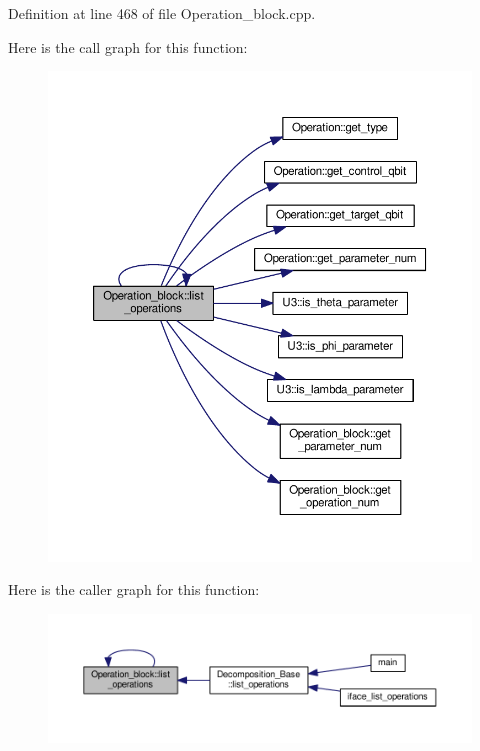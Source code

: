 Definition at line 468 of file Operation\+\_\+block.\+cpp.



Here is the call graph for this function\+:
\nopagebreak
\begin{figure}[H]
\begin{center}
\leavevmode
\includegraphics[width=350pt]{class_operation__block_a29e2c74d7fa7344193a17e39248eb803_cgraph}
\end{center}
\end{figure}




Here is the caller graph for this function\+:
\nopagebreak
\begin{figure}[H]
\begin{center}
\leavevmode
\includegraphics[width=350pt]{class_operation__block_a29e2c74d7fa7344193a17e39248eb803_icgraph}
\end{center}
\end{figure}


